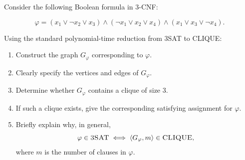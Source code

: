 \begin{problem}

Consider the following Boolean formula in 3-CNF:

\[
\varphi
=
(x_1 \lor \neg x_2 \lor x_3)
\land
(\neg x_1 \lor x_2 \lor x_4)
\land
(x_1 \lor x_3 \lor \neg x_4).
\]

Using the standard polynomial-time reduction from \textsc{3SAT} to \textsc{CLIQUE}:

\begin{enumerate}
    \item Construct the graph \(G_\varphi\) corresponding to \(\varphi\).
    
    \item Clearly specify the vertices and edges of \(G_\varphi\).
    
    \item Determine whether \(G_\varphi\) contains a clique of size \(3\).
    
    \item If such a clique exists, give the corresponding satisfying assignment for \(\varphi\).
    
    \item Briefly explain why, in general,
    \[
    \varphi \in \textsc{3SAT}
    \iff
    \langle G_\varphi, m \rangle \in \textsc{CLIQUE},
    \]
    where \(m\) is the number of clauses in \(\varphi\).
\end{enumerate}

\end{problem}